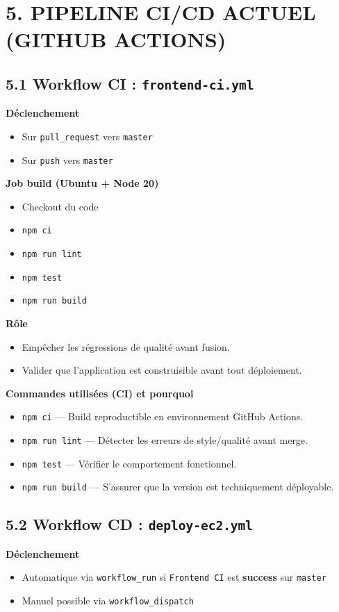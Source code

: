 \documentclass[10pt,a4paper]{article}
\begin{document}
\section{5. PIPELINE CI/CD ACTUEL (GITHUB ACTIONS)}

\subsection*{5.1 Workflow CI : \texttt{frontend-ci.yml}}
\textbf{D\'eclenchement}
\begin{itemize}
  \item Sur \texttt{pull\_request} vers \texttt{master}
  \item Sur \texttt{push} vers \texttt{master}
\end{itemize}

\textbf{Job build (Ubuntu + Node 20)}
\begin{itemize}
  \item Checkout du code
  \item \texttt{npm ci}
  \item \texttt{npm run lint}
  \item \texttt{npm test}
  \item \texttt{npm run build}
\end{itemize}

\textbf{R\^ole}
\begin{itemize}
  \item Emp\^echer les r\'egressions de qualit\'e avant fusion.
  \item Valider que l'application est construisible avant tout d\'eploiement.
\end{itemize}

\textbf{Commandes utilis\'ees (CI) et pourquoi}
\begin{itemize}
  \item \texttt{npm ci} --- Build reproductible en environnement GitHub Actions.
  \item \texttt{npm run lint} --- D\'etecter les erreurs de style/qualit\'e avant merge.
  \item \texttt{npm test} --- V\'erifier le comportement fonctionnel.
  \item \texttt{npm run build} --- S'assurer que la version est techniquement d\'eployable.
\end{itemize}

\subsection*{5.2 Workflow CD : \texttt{deploy-ec2.yml}}
\textbf{D\'eclenchement}
\begin{itemize}
  \item Automatique via \texttt{workflow\_run} si \texttt{Frontend CI} est \textbf{success} sur \texttt{master}
  \item Manuel possible via \texttt{workflow\_dispatch}
\end{itemize}
\end{document}
